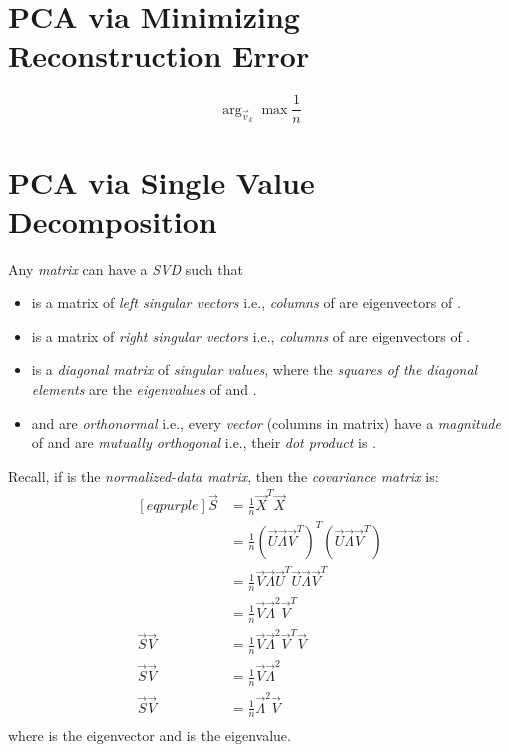 \documentclass[
	number={7},
	title={Principal Component Analysis}
]{cs584notes}
\begin{document}
\section{PCA via Minimizing Reconstruction Error}\label{sec:pca-via-minimizing-reconstruction-error}
\begin{equation}
	\arg_{\vec{v}_{k}}\max \frac{1}{n}
	\label{eq:pca-reconstruction-error}
\end{equation}

\section{PCA via Single Value Decomposition}\label{sec:pca-via-single-value-decomposition}
Any \emph{matrix}  can have a \emph{SVD} such that 
\begin{itemize}
	\item {} is a matrix of \emph{left singular vectors} i.e., \emph{columns} of  are eigenvectors of .
	\item {} is a matrix of \emph{right singular vectors} i.e., \emph{columns} of  are eigenvectors of .
	\item \data{$\vec{\Lambda}$} is a \emph{diagonal matrix} of \emph{singular values}, where the \emph{squares of the diagonal elements} are the \emph{eigenvalues} of  and .
	\item {} and  are \emph{orthonormal} i.e., every \emph{vector} (columns in matrix) have a \emph{magnitude} of  and are \emph{mutually orthogonal} i.e., their \emph{dot product} is .
\end{itemize}

Recall, if  is the \emph{normalized-data matrix}, then the \emph{covariance matrix} is:
\begin{equation*}
\begin{aligned}[eqpurple]
	\vec{S} &= \frac{1}{n}\vec{X}^{T}\vec{X}\\
	&= \frac{1}{n}\left( \vec{U}\vec{\Lambda}\vec{V}^{T} \right)^{T}\left( \vec{U}\vec{\Lambda}\vec{V}^{T} \right)\\
	&= \frac{1}{n} \vec{V} \vec{\Lambda} \vec{U}^{T} \vec{U} \vec{\Lambda} \vec{V}^{T}\\
	&= \frac{1}{n} \vec{V} \vec{\Lambda}^{2} \vec{V}^{T}\\
	\vec{S}\vec{V} &= \frac{1}{n} \vec{V} \vec{\Lambda}^{2} \vec{V}^{T}\vec{V}\\
	\vec{S}\vec{V} &= \frac{1}{n} \vec{V} \vec{\Lambda}^{2}\\
	\vec{S}\vec{V} &= \frac{1}{n} \vec{\Lambda}^{2}\vec{V}\\
\end{aligned}
\end{equation*}
where  is the eigenvector and  is the eigenvalue.
\end{document}
